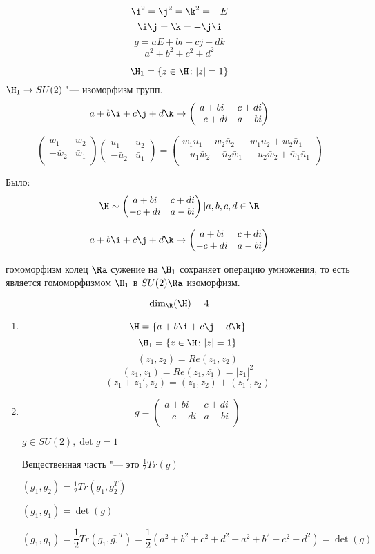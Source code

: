 $$\i^2 = \j^2 = \k^2 = -E$$
$$\i\j = \k = -\j\i$$
$$ g = aE + b i + c j + d k $$
$$a^2 + b^2 + c^2 + d^2$$

$$\H_1 = \{z \in \H \colon |z| = 1\}$$
$\H_1 \to SU(2)$ "--- изоморфизм групп.
$$a+ b\i + c\j + d\k \to \begin{pmatrix}
 a + bi & c + di\\
 -c + di & a - bi\\
 \end{pmatrix}$$

$$ 
\begin{pmatrix}
w_1 & w_2\\
-\bar w_2& \bar w_1\\
\end{pmatrix}
\begin{pmatrix}
u_1 & u_2\\
-\bar u_2 & \bar u_1
\end{pmatrix}
=
\begin{pmatrix}
w_1u_1 - w_2\bar u_2 & w_1u_2 + w_2 \bar u_1\\
-u_1\bar w_2 - \bar u_2 \bar w_1 & -u_2\bar w_2 + \bar w_1 \bar u_1\\
\end{pmatrix}
$$

Было: $$\H \sim { 
\begin{pmatrix}
a + bi & c + di\\
-c + di & a - bi\\
\end{pmatrix} | a, b, c,  d \in \R
}$$

$$a + b\i + c\j + d\k  \to 
\begin{pmatrix}
a + bi & c + di\\
-c + di & a - bi\\
\end{pmatrix}$$

гомоморфизм колец $\Ra$  сужение на $\H_1$  сохраняет 
операцию умножения, то есть является гомоморфизмом $\H_1$ в $SU(2) \Ra$ изоморфизм.

$$\dim_{\R}(\H) = 4$$

\begin{enumerate}
\item 
$$\H = \{a + b\i + c\j + d\k \}$$
$$\H_1 = \{z \in \H \colon |z| = 1\}$$
$$(z_1, z_2) = Re(z_1, \bar{z_2})$$
$$(z_1, z_1) = Re(z_1, \bar{z_1}) = |z_1|^2$$
$$(z_1 + z_1', z_2) = (z_1, z_2) + (z_1', z_2)$$
\item 
$$
g = \begin{pmatrix}
a + bi & c+ di\\
-c + di & a - bi\\
 \end{pmatrix}$$

$g \in SU(2), \det g = 1$

Вещественная часть "--- это $\frac12 Tr(g)$

$(g_1, g_2) = \frac12 Tr(g_1, \bar g_2^{T})$

$(g_1, g_1) = \det(g)$

$$(g_1, g_1) = \frac{1}{2}Tr(g_1, \bar{g_1}^{T}) = \frac{1}{2}(a^2 + b^2 + c^2 + d^2 + a^2 + b^2 + c^2 + d^2) = \det(g)$$
\end{enumerate}

